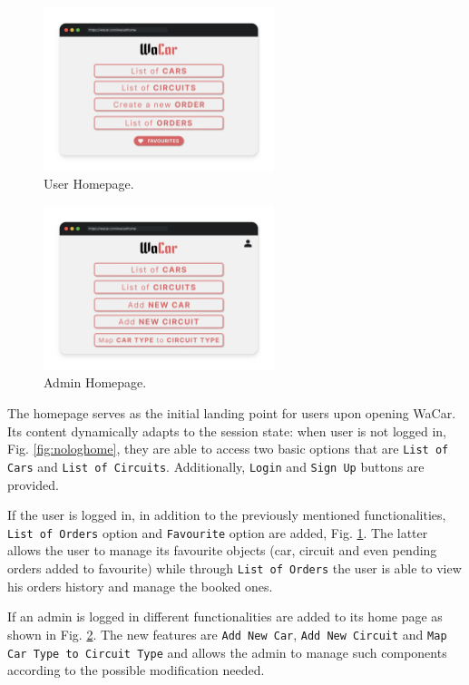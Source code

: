 \begin{figure}[h]
    \centering
    \includegraphics[width=0.6\textwidth]{mockup/UserHome.png}
    \caption{User Homepage.}
    \label{fig:usehome}
\end{figure}

\begin{figure}[h]
    \centering
    \includegraphics[width=0.6\textwidth]{mockup/AdminHome.png}
    \caption{Admin Homepage.}
    \label{fig:adminhome}
\end{figure}

The homepage serves as the initial landing point for users upon opening WaCar. Its content dynamically adapts to the session state: when user is not logged in, Fig. \ref{fig:nologhome}, they are able to access two basic options that are \texttt{List of Cars} and \texttt{List of Circuits}. Additionally, \texttt{Login} and \texttt{Sign Up} buttons are provided.

If the user is logged in, in addition to the previously mentioned functionalities, \texttt{List of Orders} option and \texttt{Favourite} option are added, Fig. \ref{fig:usehome}. The latter allows the user to manage its favourite objects (car, circuit and even pending orders added to favourite) while through \texttt{List of Orders} the user is able to view his orders history and manage the booked ones.

If an admin is logged in different functionalities are added to its home page as shown in Fig. \ref{fig:adminhome}. The new features are \texttt{Add New Car}, \texttt{Add New Circuit} and \texttt{Map Car Type to Circuit Type} and allows the admin to manage such components according to the possible modification needed.

